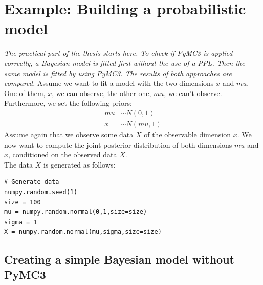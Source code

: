 \documentclass{article}
\begin{document}
\section{Example: Building a probabilistic model}
\label{sec:Comparison}
\textit{The practical part of the thesis starts here. To check if PyMC3 is applied correctly, a Bayesian model is fitted first without the use of a PPL. Then the same model is fitted by using PyMC3. The results of both approaches are compared.}
\linebreak
\linebreak
Assume we want to fit a model with the two dimensions $x$ and $mu$. One of them, $x$, we can observe, the other one, $mu$, we can't observe. Furthermore, we set the following priors:
\begin{equation}
\label{eq:data_generating_manual_example}
\begin{split}
mu &\sim N(0,1)\\
x &\sim N(mu,1)
\end{split}
\end{equation}
Assume again that we observe some data $X$ of the observable dimension $x$.
We now want to compute the joint posterior distribution of both dimensions $mu$ and $x$, conditioned on the observed data $X$.
\\
The data $X$ is generated as follows:\\
\begin{lstlisting}[caption = {Data generation for the example model}, label={list:groundtruth_example_code_data_generation}, captionpos=b]
# Generate data
numpy.random.seed(1)
size = 100
mu = numpy.random.normal(0,1,size=size)
sigma = 1
X = numpy.random.normal(mu,sigma,size=size)
\end{lstlisting}

\subsection{Creating a simple Bayesian model without PyMC3}
\label{subsec: Complete example of a simple Bayesian model}
\end{document}

